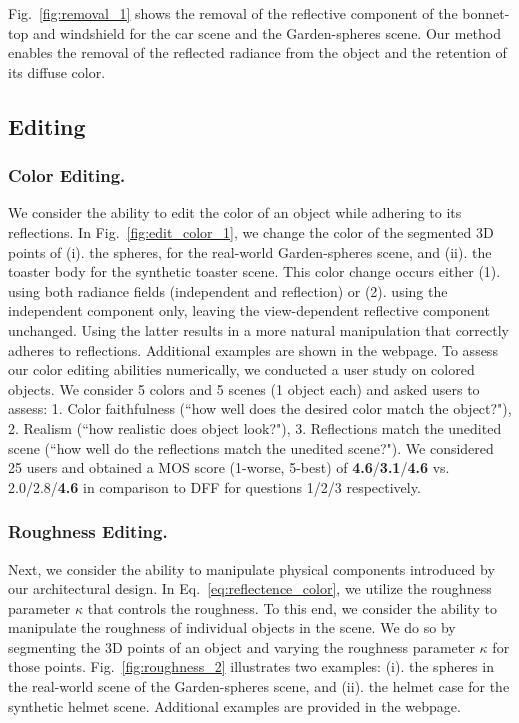 Fig.~\ref{fig:removal_1} shows the removal of the reflective component of the bonnet-top and windshield for the car scene and the Garden-spheres scene. Our method enables the removal of the reflected radiance from the object and the retention of its diffuse color.  %

\subsection{Editing}







\subsubsection{Color Editing.}

We consider the ability to edit the color of an object while adhering to its reflections. In Fig.~\ref{fig:edit_color_1}, we change the color of the segmented 3D points of (i). the spheres, for the real-world Garden-spheres scene, and (ii). the toaster body for the synthetic toaster scene. This color change occurs either (1). using both radiance fields (independent and reflection) or (2). using the independent component only, leaving the view-dependent reflective component unchanged. Using the latter results in a more natural manipulation that correctly adheres to reflections. Additional examples are shown in the webpage. 
To assess our color editing abilities numerically, we conducted a user study on colored objects. We consider 5 colors and 5 scenes (1 object each) and asked users to assess: 1. Color faithfulness (``how well does the desired color match the object?"), 2. Realism (``how realistic does object look?"), 3. Reflections match the unedited scene (``how well do the reflections match the unedited scene?"). We considered 25 users and obtained a MOS score (1-worse, 5-best) of \textbf{4.6}/\textbf{3.1}/\textbf{4.6} vs. 2.0/2.8/\textbf{4.6} in comparison to DFF for questions 1/2/3 respectively. 

\subsubsection{Roughness Editing.}


Next, we consider the ability to manipulate physical components introduced by our architectural design. In Eq.~\ref{eq:reflectence_color}, we utilize the roughness parameter $\kappa$ that controls the roughness. To this end, we consider the ability to manipulate the roughness of individual objects in the scene. We do so by segmenting the 3D points of an object and varying the roughness parameter $\kappa$ for those points. Fig.~\ref{fig:roughness_2} illustrates two examples: (i). the spheres in the real-world scene of the Garden-spheres scene, and (ii). the helmet case for the synthetic helmet scene.  
Additional examples are provided in the webpage. 







